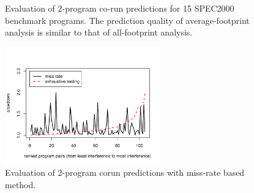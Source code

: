 \begin{figure}[h!]
\centering
{}\\
\\
\caption{Evaluation of 2-program co-run predictions for 15 SPEC2000
  benchmark programs.  The prediction quality of average-footprint analysis is similar to that of all-footprint analysis.}
\label{fig:2corun}
\end{figure}

\begin{figure}[h!]
\centering
\includegraphics[width=0.6\textwidth]{figures/corun/mr}
\caption{Evaluation of 2-program corun predictions with miss-rate
  based method.}
\label{fig:2corun-mr}
\end{figure}

